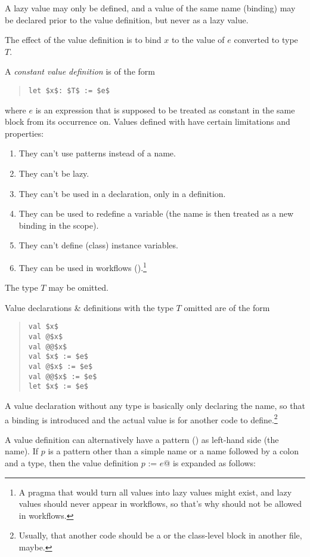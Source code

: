 A lazy value may only be defined, and a value of the same name (binding) may be declared prior to the value definition, but never as a lazy value. 

The effect of the value definition is to bind $x$ to the value of $e$ converted to type $T$. 

A {\em constant value definition} is of the form 
\begin{quote}\begin{lstlisting}
let $x$: $T$ := $e$
\end{lstlisting}\end{quote}
where $e$ is an expression that is supposed to be treated as constant in the same block from its occurrence on. Values defined with  have certain limitations and properties:

\begin{enumerate}
\item They can't use patterns instead of a name. 
\item They can't be lazy. 
\item They can't be used in a declaration, only in a definition. 
\item They can be used to redefine a variable (the name is then treated as a new binding in the scope). 
\item They can't define (class) instance variables. 
\item They can be used in workflows ().\footnote{A pragma that would turn all values into lazy values might exist, and lazy values should never appear in workflows, so that's why  should not be allowed in workflows.}
\end{enumerate}

The type $T$ may be omitted. 

Value declarations \& definitions with the type $T$ omitted are of the form
\begin{quote}\begin{lstlisting}
val $x$
val @$x$
val @@$x$
val $x$ := $e$
val @$x$ := $e$
val @@$x$ := $e$
let $x$ := $e$
\end{lstlisting}\end{quote}

A value declaration without any type is basically only declaring the name, so that a binding is introduced and the actual value is for another code to define.\footnote{Usually, that another code should be a  or the class-level block in another file, maybe.}

A value definition can alternatively have a pattern () as left-hand side (the name). If $p$ is a pattern other than a simple name or a name followed by a colon and a type, then the value definition \lstinline@val $p$ := $e$@ is expanded as follows: 

